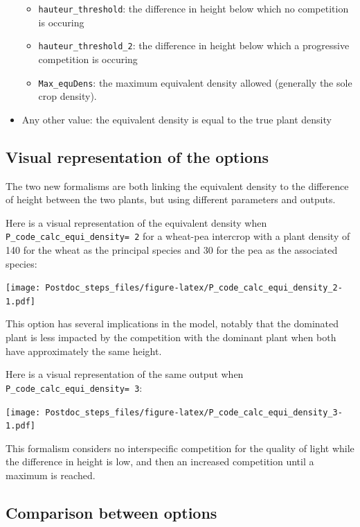 \documentclass[
]{book}
\begin{document}
\begin{itemize}
  \begin{itemize}
  \item
    \texttt{hauteur\_threshold}: the difference in height below which no competition is occuring
  \item
    \texttt{hauteur\_threshold\_2}: the difference in height below which a progressive competition is occuring
  \item
    \texttt{Max\_equDens}: the maximum equivalent density allowed (generally the sole crop density).
  \end{itemize}
\item
  Any other value: the equivalent density is equal to the true plant density
\end{itemize}

\hypertarget{visual-representation-of-the-options}{%
\subsection{Visual representation of the options}\label{visual-representation-of-the-options}}

The two new formalisms are both linking the equivalent density to the difference of height between the two plants, but using different parameters and outputs.

Here is a visual representation of the equivalent density when \texttt{P\_code\_calc\_equi\_density=\ 2} for a wheat-pea intercrop with a plant density of 140 for the wheat as the principal species and 30 for the pea as the associated species:

\texttt{[image: Postdoc\_steps\_files/figure-latex/P\_code\_calc\_equi\_density\_2-1.pdf]}

This option has several implications in the model, notably that the dominated plant is less impacted by the competition with the dominant plant when both have approximately the same height.

Here is a visual representation of the same output when \texttt{P\_code\_calc\_equi\_density=\ 3}:

\texttt{[image: Postdoc\_steps\_files/figure-latex/P\_code\_calc\_equi\_density\_3-1.pdf]}

This formalism considers no interspecific competition for the quality of light while the difference in height is low, and then an increased competition until a maximum is reached.

\hypertarget{comparison-between-options}{%
\subsection{Comparison between options}\label{comparison-between-options}}
\end{document}
